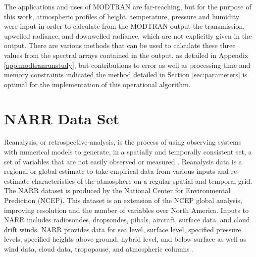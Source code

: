 \documentclass{book}
\begin{document}
The applications and uses of MODTRAN are far-reaching, but for the purpose of this work, atmospheric profiles of height, temperature, pressure and humidity were input in order to calculate from the MODTRAN output the transmission, upwelled radiance, and downwelled radiance, which are not explicitly given in the output.  There are various methods that can be used to calculate these three values from the spectral arrays contained in the output, as detailed in Appendix \ref{app:modtranrunstudy}, but contributions to error as well as processing time and memory constraints indicated the method detailed in Section \ref{sec:parameters} is optimal for the implementation of this operational algorithm.

\section{NARR Data Set}
\label{sec:narrdataset}

Reanalysis, or retrospective-analysis, is the process of using observing systems with numerical models to generate, in a spatially and temporally consistent set, a set of variables that are not easily observed or measured \cite{merra}.  Reanalysis data is a regional or global estimate to take empirical data from various inputs and re-estimate characteristics of the atmosphere on a regular spatial and temporal grid.  The NARR dataset is produced by the National Center for Environmental Prediction (NCEP).  This dataset is an extension of the NCEP global analysis, improving resolution and the number of variables over North America.  Inputs to NARR includes radiosondes, dropsondes, pibals, aircraft, surface data, and cloud drift winds.  NARR provides data for sea level, surface level, specified pressure levels, specified heights above ground, hybrid level, and below surface as well as wind data, cloud data, tropopause, and atmospheric columns \cite{narr}.
\end{document}
